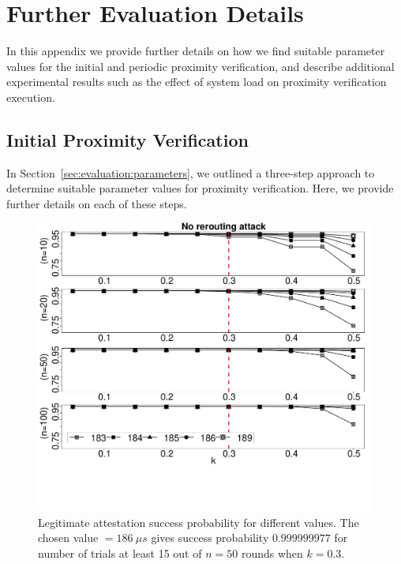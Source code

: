\section{Further Evaluation Details}
\label{sec:newResults}

In this appendix we provide further details on how we find suitable parameter values for the initial and periodic proximity verification, and describe additional experimental results such as the effect of system load on proximity verification execution.


\subsection{Initial Proximity Verification}
\label{sec:newResults:distanceBound}

In Section~\ref{sec:evaluation:parameters}, we outlined a three-step approach to determine suitable parameter values for proximity verification. Here, we provide further details on each of these steps. 


\begin{figure}[t]
  \centering
    \includegraphics[trim={0 5cm 0 0}, clip, width=\linewidth]{data/fx3_data/timeRound.pdf}
    \caption{Legitimate attestation success probability for different \connect values. The chosen value \connect $=186\ \mu s$ gives success probability $0.999999977$ for number of trials at least 15 out of $n=50$ rounds when $k=0.3$.}
	\figsaver
    \label{graph:diffTh}
\end{figure}


